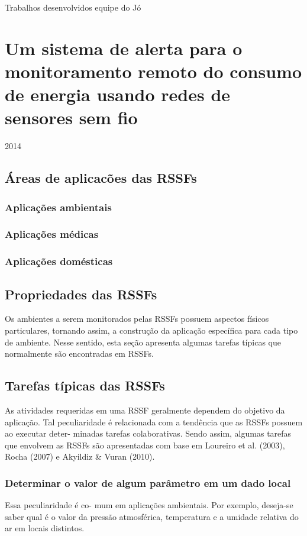 
Trabalhos desenvolvidos equipe do Jó

\chapter{Um sistema de alerta para o monitoramento remoto do consumo de energia usando redes de sensores sem fio}
2014

\section{Áreas de aplicacões das RSSFs}

	\subsection{Aplicações ambientais}
	
	\subsection{Aplicações médicas}
	
	\subsection{Aplicações domésticas}

\section{Propriedades das RSSFs} 
Os ambientes a serem monitorados pelas RSSFs possuem aspectos físicos particulares, tornando assim, a construção da aplicação específica para cada tipo de ambiente. Nesse sentido, esta seção apresenta algumas tarefas típicas que normalmente são encontradas em RSSFs.

\section{Tarefas típicas das RSSFs} 

As atividades requeridas em uma RSSF geralmente dependem do objetivo da aplicação. Tal peculiaridade é relacionada com a tendência que as RSSFs possuem ao executar deter- minadas tarefas colaborativas. Sendo assim, algumas tarefas que envolvem as RSSFs são apresentadas com base em Loureiro et al. (2003), Rocha (2007) e Akyildiz & Vuran (2010).

	\subsection{Determinar o valor de algum parâmetro em um dado local}
		Essa peculiaridade é co- mum em aplicações ambientais. Por exemplo, deseja-se saber qual é o valor da pressão atmosférica, temperatura e a umidade relativa do ar em locais distintos.
	
